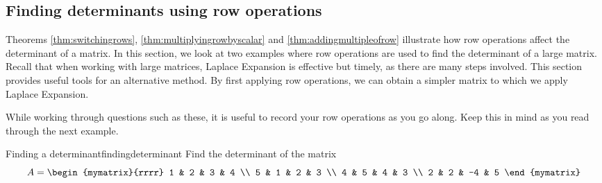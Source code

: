 \subsection{Finding determinants using row operations}

Theorems \ref{thm:switchingrows}, \ref{thm:multiplyingrowbyscalar} and \ref{thm:addingmultipleofrow} illustrate 
how row operations affect the determinant of a matrix. In this section, we look at two examples where row operations are 
used to find the determinant of a large matrix. Recall that when working with large matrices, Laplace Expansion
is effective but timely, as there are many steps involved. This section provides useful tools for
an alternative method. By first applying row operations, we can obtain a simpler matrix to which we apply Laplace Expansion. 

While working through questions such as these, it is useful to record your row operations as you go along. Keep this in mind
as you read through the next example. 

\begin{example}{Finding a determinant}{findingdeterminant}
Find the determinant of the matrix
\begin{equation*}
A=\begin{mymatrix}{rrrr}
1 & 2 & 3 & 4 \\
5 & 1 & 2 & 3 \\
4 & 5 & 4 & 3 \\
2 & 2 & -4 & 5
\end{mymatrix}
\end{equation*}
\end{example}

